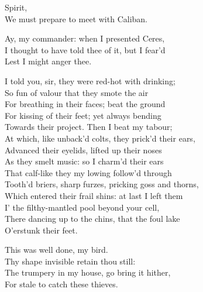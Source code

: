 

\begin{verse_speech}[Prospero] 
Spirit,\\
We must prepare to meet with Caliban.
\end{verse_speech}

\begin{verse_speech}[Ariel] 
Ay, my commander: when I presented Ceres,\\
I thought to have told thee of it, but I fear'd\\
Lest I might anger thee.
\end{verse_speech}


\begin{verse_speech}[Ariel] 
I told you, sir, they were red-hot with drinking;\\
So fun of valour that they smote the air\\
For breathing in their faces; beat the ground\\
For kissing of their feet; yet always bending\\
Towards their project. Then I beat my tabour;\\
At which, like unback'd colts, they prick'd their ears,\\
Advanced their eyelids, lifted up their noses\\
As they smelt music: so I charm'd their ears\\
That calf-like they my lowing follow'd through\\
Tooth'd briers, sharp furzes, pricking goss and thorns,\\
Which entered their frail shins: at last I left them\\
I' the filthy-mantled pool beyond your cell,\\
There dancing up to the chins, that the foul lake\\
O'erstunk their feet.
\end{verse_speech}

\begin{verse_speech}[Prospero] 
This was well done, my bird.\\
Thy shape invisible retain thou still:\\
The trumpery in my house, go bring it hither,\\
For stale to catch these thieves.
\end{verse_speech}

